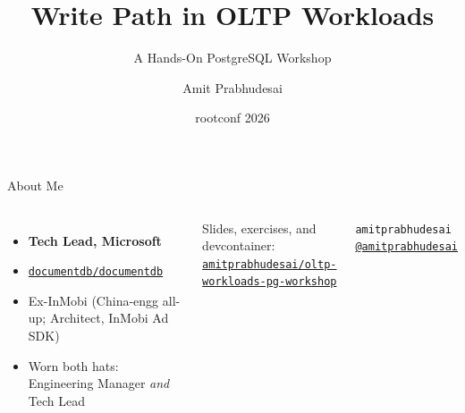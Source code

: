 \documentclass[aspectratio=169,10pt]{beamer}
\title{Write Path in OLTP Workloads}
\subtitle{A Hands-On PostgreSQL Workshop}
\author{Amit Prabhudesai}
\institute{Tech Lead, Microsoft}
\date{rootconf 2026}
\begin{document}

\maketitle

\begin{frame}{About Me}
  \begin{columns}[T]
    \begin{itemize}
      \item \textbf{Tech Lead, Microsoft}
      \item \href{https://github.com/documentdb/documentdb}{%
        \faGithub\enspace\texttt{documentdb/documentdb}}
      \item Ex-InMobi (China-engg all-up; Architect, InMobi Ad SDK)
      \item Worn both hats: Engineering Manager \textit{and} Tech Lead
    \end{itemize}
    \vspace{0.6em}
    {\small Slides, exercises, and devcontainer:}\\[0.3em]
    \href{https://github.com/amitprabhudesai/oltp-workloads-pg-workshop}{%
      \faGithub\enspace\texttt{amitprabhudesai/oltp-workloads-pg-workshop}}

    \vspace{1em}
    {\large\faGithub}\enspace\texttt{amitprabhudesai}\\[0.5em]
    {\large\faTwitter}\enspace\href{https://x.com/amitprabhudesai}{\texttt{@amitprabhudesai}}
  \end{columns}
\end{frame}
\end{document}
